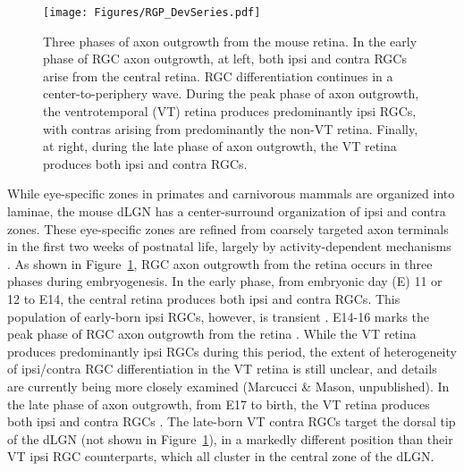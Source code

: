 \begin{figure}[hbtp]
	\begin{center}
		\texttt{[image: Figures/RGP\_DevSeries.pdf]}
		\caption[Three phases of axon outgrowth from the mouse retina.]
		{Three phases of axon outgrowth from the mouse retina.
		In the early phase of RGC axon outgrowth, at left, both ipsi and contra RGCs arise from the central retina.
		RGC differentiation continues in a center-to-periphery wave.
		During the peak phase of axon outgrowth, the ventrotemporal (VT) retina produces predominantly ipsi RGCs, with contras arising from predominantly the non-VT retina.
		Finally, at right, during the late phase of axon outgrowth, the VT retina produces both ipsi and contra RGCs.}
		\label{Figures/RGP_DevSeries}
	\end{center}
\end{figure}
While eye-specific zones in primates and carnivorous mammals are organized into laminae, the mouse dLGN has a center-surround organization of ipsi and contra zones.
These eye-specific zones are refined from coarsely targeted axon terminals in the first two weeks of postnatal life, largely by activity-dependent mechanisms \cite{huberman2008mechanisms,feldheim2010visual}.
As shown in Figure~\ref{Figures/RGP_DevSeries}, RGC axon outgrowth from the retina occurs in three phases during embryogenesis.
In the early phase, from embryonic day (E) 11 or 12 to E14, the central retina produces both ipsi and contra RGCs.
This population of early-born ipsi RGCs, however, is transient \cite{drager1985birth,colello1990early,soares2015transient}.
E14-16 marks the peak phase of RGC axon outgrowth from the retina \cite{drager1985birth,petros2008retinal}.
While the VT retina produces predominantly ipsi RGCs during this period, the extent of heterogeneity of ipsi/contra RGC differentiation in the VT retina is still unclear, and details are currently being more closely examined (Marcucci \& Mason, unpublished).
In the late phase of axon outgrowth, from E17 to birth, the VT retina produces both ipsi and contra RGCs \cite{drager1985birth,petros2008retinal}.
The late-born VT contra RGCs target the dorsal tip of the dLGN (not shown in Figure~\ref{Figures/RGP_DevSeries}), in a markedly different position than their VT ipsi RGC counterparts, which all cluster in the central zone of the dLGN.